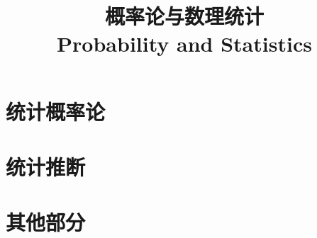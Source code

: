 \documentclass{../thunote}
\title{概率论与数理统计\\Probability and Statistics}
\begin{document}
\maketitle

\frontmatter
\tableofcontents


\mainmatter
\part{统计概率论}







\part{统计推断}







\part{其他部分}




\appendix

\end{document}

